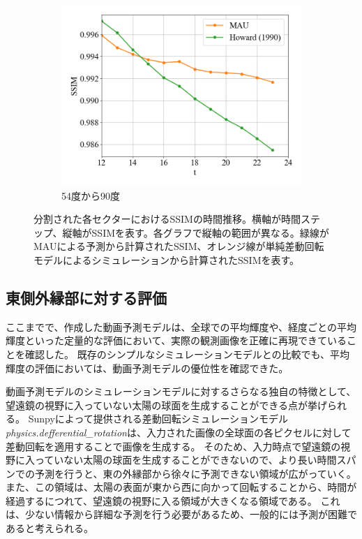 \begin{figure}[htbp]
\begin{subfigure}{0.5\textwidth}
              \includegraphics[width=\textwidth]{figures/exp1/lng_ssim_5.png}
              \caption{54度から90度}
            \end{subfigure}
            \caption{分割された各セクターにおけるSSIMの時間推移。横軸が時間ステップ、縦軸がSSIMを表す。各グラフで縦軸の範囲が異なる。緑線がMAUによる予測から計算されたSSIM、オレンジ線が単純差動回転モデルによるシミュレーションから計算されたSSIMを表す。}
            \label{fig:exp1_lng_ssim}
          \end{figure}

    
    \subsection{東側外縁部に対する評価}
      ここまでで、作成した動画予測モデルは、全球での平均輝度や、経度ごとの平均輝度といった定量的な評価において、実際の観測画像を正確に再現できていることを確認した。
      既存のシンプルなシミュレーションモデルとの比較でも、平均輝度の評価においては、動画予測モデルの優位性を確認できた。

      動画予測モデルのシミュレーションモデルに対するさらなる独自の特徴として、望遠鏡の視野に入っていない太陽の球面を生成することができる点が挙げられる。
      Sunpyによって提供される差動回転シミュレーションモデル\textit{physics.defferential\_rotation}は、入力された画像の全球面の各ピクセルに対して差動回転を適用することで画像を生成する。
      そのため、入力時点で望遠鏡の視野に入っていない太陽の球面を生成することができないので、より長い時間スパンでの予測を行うと、東の外縁部から徐々に予測できない領域が広がっていく。
      また、この領域は、太陽の表面が東から西に向かって回転することから、時間が経過するにつれて、望遠鏡の視野に入る領域が大きくなる領域である。
      これは、少ない情報から詳細な予測を行う必要があるため、一般的には予測が困難であると考えられる。

